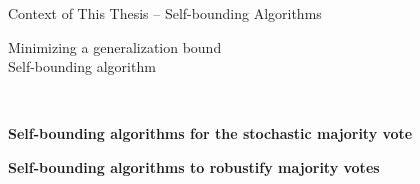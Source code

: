 \documentclass{slides}
\begin{document}

\begin{xframe}{Context of This Thesis -- {\small Self-bounding Algorithms}}

   \vspace{-0.3cm}

  \begin{redbox}{}
   Minimizing a generalization bound\\
  \red{$\Rightarrow$} Self-bounding algorithm~\citep{Freund1998}

  \vspace{-0.6cm}
  
  \begin{figure}
  \centering
  
  \end{figure}
  \end{redbox}

  \vspace{-0.5cm}

  \begin{xblock}{}
      \\
      \begin{xitemize}
      \item {\bf Self-bounding algorithms for the stochastic majority vote}\\

      \item {\bf Self-bounding algorithms to robustify majority votes}\\
      \end{xitemize}
  \end{xblock}
    
\end{xframe}

\end{document}
